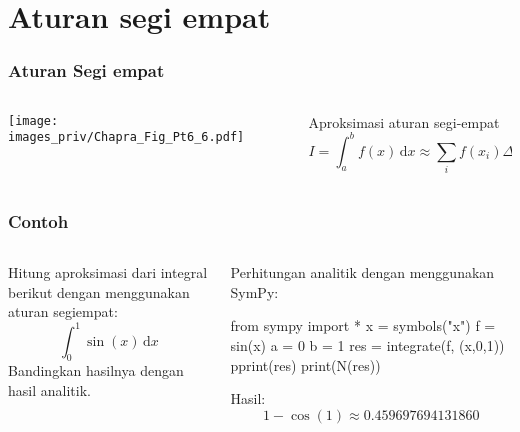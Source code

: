 \section{Aturan segi empat}

\begin{frame}
\frametitle{Aturan Segi empat}

\begin{columns}

\begin{column}{0.5\textwidth}
{\centering
\texttt{[image: images\_priv/Chapra\_Fig\_Pt6\_6.pdf]}
}
\end{column}

\begin{column}{0.5\textwidth}
Aproksimasi aturan segi-empat
\begin{equation*}
I = \int_{a}^{b} f(x) \,\mathrm{d}x \approx \sum_{i} f(x_{i}) \Delta x
\end{equation*}
\end{column}

\end{columns}
  
\end{frame}


\begin{frame}[fragile]
\frametitle{Contoh}

\begin{columns}

\begin{column}{0.5\textwidth}
Hitung aproksimasi dari integral berikut dengan menggunakan aturan segiempat:
\begin{equation*}
\int_{0}^{1} \sin(x) \, \mathrm{d}x
\end{equation*}
Bandingkan hasilnya dengan hasil analitik.  
\end{column}

\begin{column}{0.5\textwidth}
Perhitungan analitik dengan menggunakan SymPy:
\begin{pythoncode}
from sympy import *
x = symbols("x")
f = sin(x)
a = 0
b = 1
res = integrate(f, (x,0,1))
pprint(res)
print(N(res))
\end{pythoncode}
Hasil:
\begin{equation*}
1 - \cos(1) \approx 0.459697694131860
\end{equation*}
\end{column}

\end{columns}

\end{frame}


